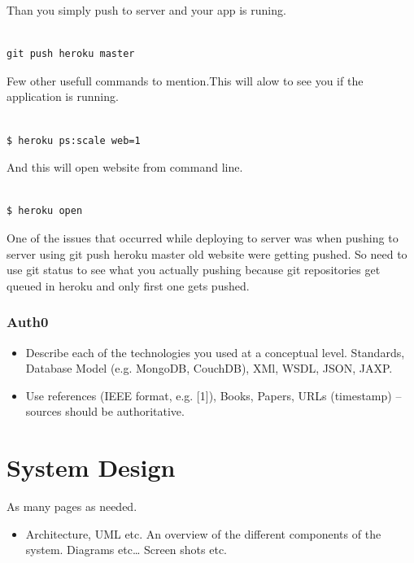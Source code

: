 Than you simply push to server and your app is runing.
\bigbreak
\begin{verbatim}

git push heroku master

\end{verbatim}
\bigbreak

Few other usefull commands to mention.This will alow to see you if the application is running.

\bigbreak
\begin{verbatim}

$ heroku ps:scale web=1

\end{verbatim}
\bigbreak

And this will open website from command line.

\bigbreak
\begin{verbatim}

$ heroku open

\end{verbatim}
\bigbreak

One of the issues that occurred while deploying to server was when pushing to server using git push heroku master old website were getting pushed. So need to use git status to see what you actually pushing because git repositories get queued in heroku and only first one gets pushed.








\subsection{Auth0}





\begin{itemize}
\item Describe each of the technologies you used at a conceptual level. Standards, Database Model (e.g. MongoDB, CouchDB), XMl, WSDL, JSON, JAXP.
\item Use references (IEEE format, e.g. [1]), Books, Papers, URLs (timestamp) – sources should be authoritative. 
\end{itemize}



\chapter{System Design}
As many pages as needed.
\begin{itemize}
\item Architecture, UML etc. An overview of the different components of the system. Diagrams etc… Screen shots etc.
\end{itemize}

